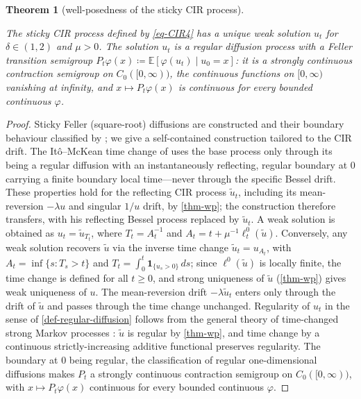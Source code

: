 \documentclass[aap,preprint]{imsart}
\numberwithin{equation}{section}
\theoremstyle{plain}
\newtheorem{theorem}{Theorem}[section]
\theoremstyle{definition}
\begin{document}
\begin{theorem}[well-posedness of the sticky CIR
process]\label{thm-sticky-wp}

The sticky CIR process defined by \cref{eq-CIR4} has a unique
weak solution \(u_t\) for \(\delta\in(1,2)\) and  \(\mu> 0\). The solution \(u_t\) is a regular
diffusion process with a Feller transition semigroup
$P_t\varphi(x)\coloneqq\mathbb{E}[\varphi(u_t)\mid u_0=x]$: it is a strongly continuous
contraction semigroup on $C_0([0,\infty))$, the continuous functions on $[0,\infty)$
vanishing at infinity, and $x\mapsto P_t\varphi(x)$ is continuous for every bounded
continuous $\varphi$.

\end{theorem}

\begin{proof}
Sticky Feller (square-root) diffusions are constructed and their boundary behaviour classified by \citet{PeskirRoodman2023}; we give a self-contained construction tailored to the CIR drift. The It\^o--McKean time change of \citet[Section~2]{Peskir2022} uses the base process only through its being a regular diffusion with an instantaneously reflecting, regular boundary at $0$ carrying a finite boundary local time---never through the specific Bessel drift. These properties hold for the reflecting CIR process $\tilde u_t$, including its mean-reversion $-\lambda u$ and singular $1/u$ drift, by \cref{thm-wp}; the construction therefore transfers, with his reflecting Bessel process replaced by $\tilde u_t$. A weak solution is obtained as $u_t = \tilde u_{T_t}$, where $T_t = A_t^{-1}$ and $A_t = t + \mu^{-1}\ell_t^0(\tilde u)$. Conversely, any weak solution recovers $\tilde u$ via the inverse time change $\tilde u_t = u_{A_t}$, with $A_t = \inf\{s : T_s > t\}$ and $T_t = \int_0^t \mathbf{1}_{\{u_s>0\}}\,ds$; since $\ell^0(\tilde u)$ is locally finite, the time change is defined for all $t \ge 0$, and strong uniqueness of $\tilde u$ (\cref{thm-wp}) gives weak uniqueness of $u$. The mean-reversion drift $-\lambda \tilde u_t$ enters only through the drift of $\tilde u$ and passes through the time change unchanged. Regularity of $u_t$ in the sense of \cref{def-regular-diffusion} follows from the general theory of time-changed strong Markov processes \citep{Volkonskii1958}: $\tilde u$ is regular by \cref{thm-wp}, and time change by a continuous strictly-increasing additive functional preserves regularity. The boundary at $0$ being regular, the classification of regular one-dimensional diffusions \citep[\S4]{ItoMcKean1965} makes $P_t$ a strongly continuous contraction semigroup on $C_0([0,\infty))$, with $x\mapsto P_t\varphi(x)$ continuous for every bounded continuous $\varphi$.
\end{proof}
\end{document}
